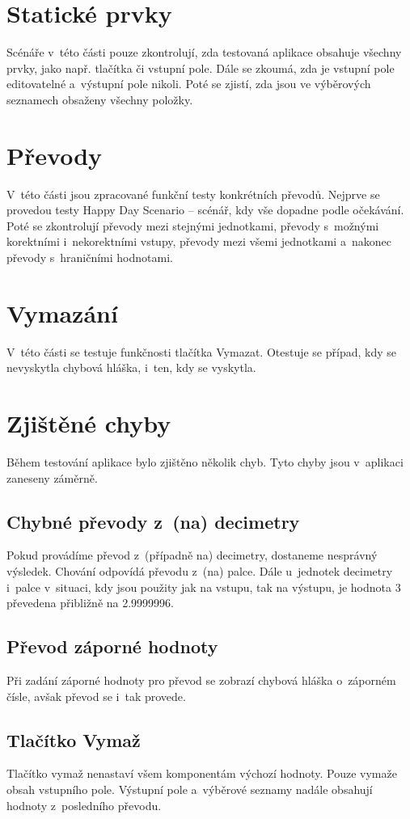 	\section{Statické prvky}
	Scénáře v~této části pouze zkontrolují, zda testovaná aplikace obsahuje všechny prvky, jako např. tlačítka či vstupní pole. Dále se zkoumá, zda je vstupní pole editovatelné a~výstupní pole nikoli. Poté se zjistí, zda jsou ve výběrových seznamech obsaženy všechny položky.
	
	\section{Převody}
	V~této části jsou zpracované funkční testy konkrétních převodů. Nejprve se provedou testy Happy Day Scenario -- scénář, kdy vše dopadne podle očekávání. Poté se zkontrolují převody mezi stejnými jednotkami, převody s~možnými korektními i~nekorektními vstupy, převody mezi všemi jednotkami a~nakonec převody s~hraničními hodnotami.
	
	\section{Vymazání}
	V~této části se testuje funkčnosti tlačítka Vymazat. Otestuje se případ, kdy se nevyskytla chybová hláška, i~ten, kdy se vyskytla.
	
	\section{Zjištěné chyby}
	Během testování aplikace bylo zjištěno několik chyb. Tyto chyby jsou v~aplikaci zaneseny záměrně.
	
		\subsection{Chybné převody z~(na) decimetry}
		Pokud provádíme převod z~(případně na) decimetry, dostaneme nesprávný výsledek. Chování odpovídá převodu z~(na) palce. Dále u~jednotek decimetry i~palce v~situaci, kdy jsou použity jak na vstupu, tak na výstupu, je hodnota 3 převedena přibližně na 2.9999996.
		
		\subsection{Převod záporné hodnoty}
		Při zadání záporné hodnoty pro převod se zobrazí chybová hláška o~záporném čísle, avšak převod se i~tak provede.
		
		\subsection{Tlačítko Vymaž}
		Tlačítko vymaž nenastaví všem komponentám výchozí hodnoty. Pouze vymaže obsah vstupního pole. Výstupní pole a~výběrové seznamy nadále obsahují hodnoty z~posledního převodu.